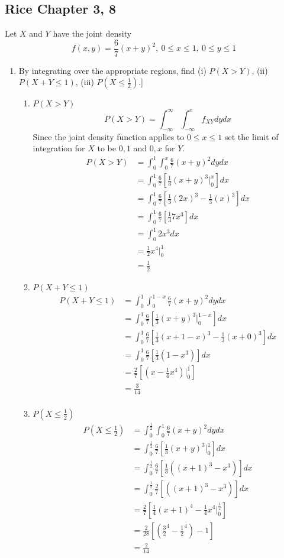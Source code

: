 \documentclass{tufte-book}
\theoremstyle{mytheoremstyle}
\theoremstyle{mylemstyle}
\theoremstyle{mydefstyle}
\begin{document}
\subsection{Rice Chapter 3, 8}
Let $X$ and $Y$ have the joint density
\[f(x,y) = \frac{6}{7}(x+y)^2 ,\  0\leq x\leq1 ,\ 0\leq y\leq 1\]

\begin{enumerate}
\item By integrating over the appropriate regions, find (i) $P(X>Y)$, (ii) $P(X+Y \leq 1)$, (iii) $P(X \leq \frac{1}{2})$.]\

\begin{enumerate}
\item $P(X>Y)$
\[ P(X>Y) = \int_{-\infty}^{\infty}\int_{-\infty}^{x}f_{XY}dydx \]
Since the joint density function applies to $0\leq x \leq 1$ set the limit of integration for $X$ to be $0,1$ and $0,x$ for $Y$.
\begin{align*}
P(X>Y) &= \int_{0}^{1}\int_{0}^{x}\frac{6}{7}(x+y)^2dydx\\
&= \int_{0}^{1}\frac{6}{7}[\frac{1}{3}(x+y)^3\Big|_0^x]dx\\
&= \int_{0}^{1}\frac{6}{7}[\frac{1}{3}(2x)^3 - \frac{1}{3}(x)^3]dx\\
&= \int_{0}^{1}\frac{6}{7}[\frac{1}{3}7x^3]dx\\
&=\int_{0}^{1}2x^3dx\\
&=\frac{1}{2}x^4\Big|_0^1\\
&= \frac{1}{2}
\end{align*}

\item $P(X+Y\leq 1)$
\begin{align*}
P(X+Y \leq 1) &= \int_{0}^{1}\int_{0}^{1-x}\frac{6}{7}(x+y)^2dydx\\
&= \int_{0}^{1}\frac{6}{7}[\frac{1}{3}(x+y)^3\Big|_0^{1-x}]dx\\
&=\int_{0}^{1}\frac{6}{7}[\frac{1}{3}(x+1-x)^3-\frac{1}{3}(x+0)^3]dx\\
&=\int_{0}^{1}\frac{6}{7}[\frac{1}{3}(1-x^3)]dx\\
&=\frac{2}{7}[(x-\frac{1}{4}x^4)\Big|_0^1]\\
&= \frac{3}{14}\\
\end{align*}

\item $P(X \leq \frac{1}{2})$
\begin{align*}
P(X\leq \frac{1}{2}) &=  \int_{0}^{\frac{1}{2}}\int_{0}^{1}\frac{6}{7}(x+y)^2dydx\\
&= \int_{0}^{\frac{1}{2}}\frac{6}{7}[\frac{1}{3}(x+y)^3\Big|_0^1]dx\\
&=\int_{0}^{\frac{1}{2}}\frac{6}{7}[\frac{1}{3}((x+1)^3-x^3)]dx\\
&=\int_{0}^{\frac{1}{2}}\frac{2}{7}[((x+1)^3-x^3)]dx\\
&= \frac{2}{7}[\frac{1}{4}(x+1)^4-\frac{1}{4}x^4\Big|_0^\frac{1}{2}]\\
&=\frac{2}{28}[(\frac{3}{2}^4 - \frac{1}{2}^4) - 1]\\
&=\frac{2}{14}
\end{align*}
\end{enumerate}


\end{enumerate}
\end{document}
